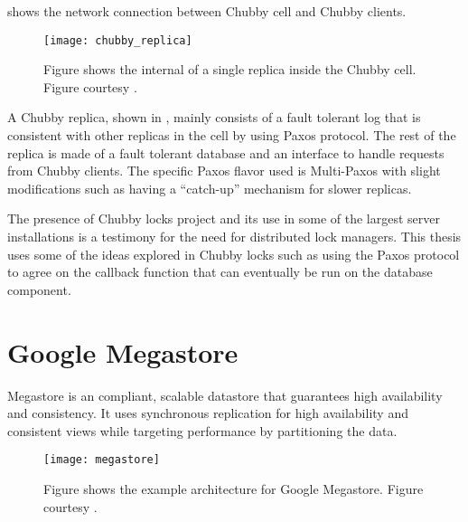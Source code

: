  shows the network connection between Chubby cell
 and Chubby clients.

\begin{figure}
  \texttt{[image: chubby\_replica]}
  \caption[Chubby Replica]{%
    Figure shows the internal of a single replica inside the Chubby cell.
    Figure courtesy \citet{ChandraGR07}.}
  \label{figure:chubby.structure}
\end{figure}

A Chubby replica, shown in , mainly consists of a
fault tolerant log that is consistent
with other replicas in the cell by using Paxos protocol. The rest of the
replica is made of a fault tolerant database and an interface to handle
requests from Chubby clients. The specific Paxos flavor used is Multi-Paxos
with slight modifications such as having a ``catch-up'' mechanism for
slower replicas.

The presence of Chubby locks project and its use in some of the largest
server installations is a testimony for the need for distributed lock
managers. This thesis uses some of the ideas explored in Chubby locks such
as using the Paxos protocol to agree on the callback function that can
eventually be run on the database component.

\section{Google Megastore}

Megastore \citep{BakerBCFKLLLLY11} is an %
compliant, scalable datastore that guarantees high availability and
consistency. It uses synchronous replication for high availability and
consistent views while targeting performance by partitioning the data.

\begin{figure}
  \texttt{[image: megastore]}
  \caption[Google Megastore]{%
    Figure shows the example architecture for Google Megastore.
    Figure courtesy \citet{BakerBCFKLLLLY11}.}
  \label{figure:megastore}
\end{figure}

